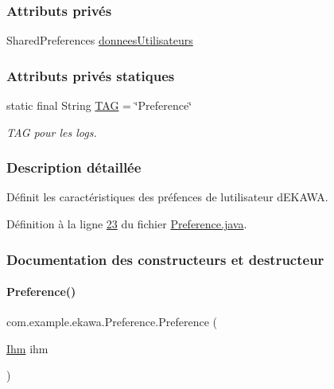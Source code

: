 \subsubsection*{Attributs privés}
\begin{DoxyCompactItemize}
\item 
Shared\+Preferences \hyperlink{classcom_1_1example_1_1ekawa_1_1_preference_a5ac49439bd1c8c3ff12dd9eb2475b894}{donnees\+Utilisateurs}
\end{DoxyCompactItemize}
\subsubsection*{Attributs privés statiques}
\begin{DoxyCompactItemize}
\item 
static final String \hyperlink{classcom_1_1example_1_1ekawa_1_1_preference_aeb5e1e787153c37929839622ac5d0339}{T\+AG} = \char`\"{}Preference\char`\"{}
\begin{DoxyCompactList}\small\item\em T\+AG pour les logs. \end{DoxyCompactList}\end{DoxyCompactItemize}


\subsubsection{Description détaillée}
Définit les caractéristiques des préfences de l\textquotesingle{}utilisateur d\textquotesingle{}E\+K\+A\+WA. 

Définition à la ligne \hyperlink{_preference_8java_source_l00023}{23} du fichier \hyperlink{_preference_8java_source}{Preference.\+java}.



\subsubsection{Documentation des constructeurs et destructeur}
\mbox{\label{classcom_1_1example_1_1ekawa_1_1_preference_a2594deda470fb764d1ac8e06cf504411}} 
\paragraph{\texorpdfstring{Preference()}{Preference()}}
{\footnotesize\ttfamily com.\+example.\+ekawa.\+Preference.\+Preference (\begin{DoxyParamCaption}\item[{\hyperlink{classcom_1_1example_1_1ekawa_1_1_ihm}{Ihm}}]{ihm }\end{DoxyParamCaption})}




